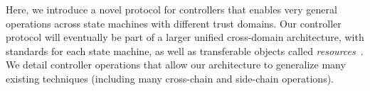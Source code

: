 \documentclass[a4paper,USenglish,cleveref, autoref, thm-restate, anonymous]{lipics-v2021}
\newcommand{\colort}[2]{{\color{#1}{#2}}}
\newcommand{\blue}[1]{\colort{blue}{#1}}
\newcommand{\purple}[1]{{\colort{purple}{#1}}}
\newcommand{\basecoin}{\blue{BaseCoin}}
\newcommand{\basechain}{\blue{BaseChain}}
\newcommand{\sidechain}{\purple{SideChain}}
\begin{document}
Here, we introduce a novel protocol for controllers that enables very general operations across state machines with different trust domains.
Our controller protocol will eventually be part of a larger unified cross-domain architecture, with standards for each state machine, as well as transferable objects called \emph{resources}~\cite{resource}.
We detail controller operations that allow our architecture to generalize many existing techniques (including many cross-chain and side-chain operations). 




\end{document}
